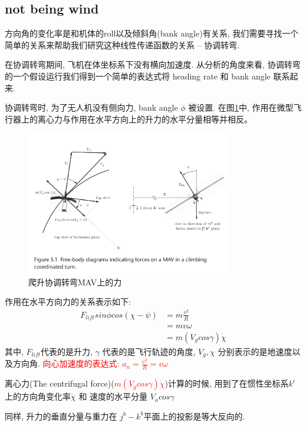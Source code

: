 \subsection{not being wind}
方向角的变化率是和机体的roll以及倾斜角(bank angle)有关系, 我们需要寻找一个简单的关系来帮助我们研究这种线性传递函数的关系 -- 协调转弯. \par
在协调转弯期间, 飞机在体坐标系下没有横向加速度. 从分析的角度来看, 协调转弯的一个假设运行我们得到一个简单的表达式将 heading rate 和 bank angle 联系起来. \par
协调转弯时, 为了无人机没有侧向力, bank angle $\phi$ 被设置.
在图\ref{fig:1}中, 作用在微型飞行器上的离心力与作用在水平方向上的升力的水平分量相等并相反。
\begin{figure}[htpb]
    \centering
    \includegraphics[width=0.8\textwidth]{pictures/5_1.png}
    \caption{爬升协调转弯MAV上的力}
    \label{fig:1}
\end{figure}
\par 作用在水平方向力的关系表示如下: 
\begin{align}
    F_{lift} sin \phi cos (\chi - \psi) &= m \frac{v^{2}}{R} \nonumber \\
    &= m v \omega \nonumber \\
    &= m (V_{g} cos \gamma) \dot{\chi} 
    \label{equ:1}
\end{align}
其中, $F_{lift}$代表的是升力, $\gamma$ 代表的是飞行轨迹的角度, $V_{g}, \chi$ 分别表示的是地速度以及方向角. \textcolor{red}{向心加速度的表达式: $a_{n} = \frac{v^{2}}{R} = v \omega$}
\par 离心力(The centrifugal force)(\textcolor{red}{$m (V_{g} cos \gamma) \dot{\chi} $})计算的时候, 用到了在惯性坐标系$k^{i}$上的方向角变化率$\dot{\chi}$ 和 速度的水平分量 $V_{a}cos \gamma$
\par 同样, 升力的垂直分量与重力在 $j^{b} - k^{b}$平面上的投影是等大反向的. 

